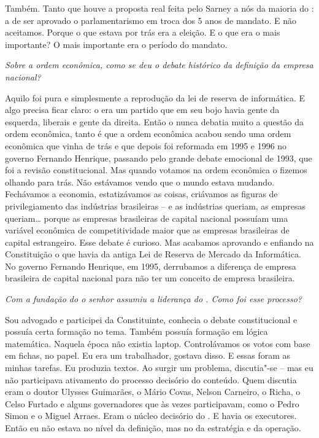 Também. Tanto que houve a proposta real feita pelo
Sarney a nós da maioria do : a de ser aprovado o parlamentarismo em
troca dos 5 anos de mandato. E não aceitamos. Porque o que estava por
trás era a eleição. E o que era o mais importante? O mais importante era
o período do mandato.

\medskip

\noindent\emph{Sobre a ordem econômica, como se deu o debate histórico da definição da
empresa nacional?}

Aquilo foi pura e simplesmente a reprodução da lei de
reserva de informática. E algo precisa ficar claro: o  era um
partido que em seu bojo havia gente da esquerda, liberais e gente da
direita. Então o  nunca debatia muito a questão da ordem econômica,
tanto é que a ordem econômica acabou sendo uma ordem econômica que vinha
de trás e que depois foi reformada em 1995 e 1996 no governo Fernando
Henrique, passando pelo grande debate emocional de 1993, que foi a
revisão constitucional. Mas quando votamos na ordem econômica o fizemos
olhando para trás. Não estávamos vendo que o mundo estava mudando.
Fechávamos a economia, estatizávamos as coisas, criávamos as figuras de
privilegiamento das indústrias brasileiras -- e as indústrias queriam,
as empresas queriam\ldots{} porque as empresas brasileiras de capital
nacional possuíam uma variável econômica de competitividade maior que as
empresas brasileiras de capital estrangeiro. Esse debate é curioso. Mas
acabamos aprovando e enfiando na Constituição o que havia da antiga Lei
de Reserva de Mercado da Informática. No governo Fernando Henrique, em
1995, derrubamos a diferença de empresa brasileira de capital nacional
para não ter um conceito de empresa brasileira.

\medskip

\noindent\emph{Com a fundação do  o senhor assumiu a liderança do . Como foi
esse processo?}

Sou advogado e participei da Constituinte, conhecia o
debate constitucional e possuía certa formação no tema. Também possuía
formação em lógica matemática. Naquela época não existia laptop.
Controlávamos os votos com base em fichas, no papel. Eu era um
trabalhador, gostava disso. E essas foram as minhas tarefas. Eu produzia
textos. Ao surgir um problema, discutia"-se -- mas eu não participava
ativamento do processo decisório do conteúdo. Quem discutia eram o
doutor Ulysses Guimarães, o Mário Covas, Nelson Carneiro, o Richa, o
Celso Furtado e alguns governadores que às vezes participavam, como o
Pedro Simon e o Miguel Arraes. Eram o núcleo decisório do . E havia
os executores. Então eu não estava no nível da definição, mas no da
estratégia e da operação.

